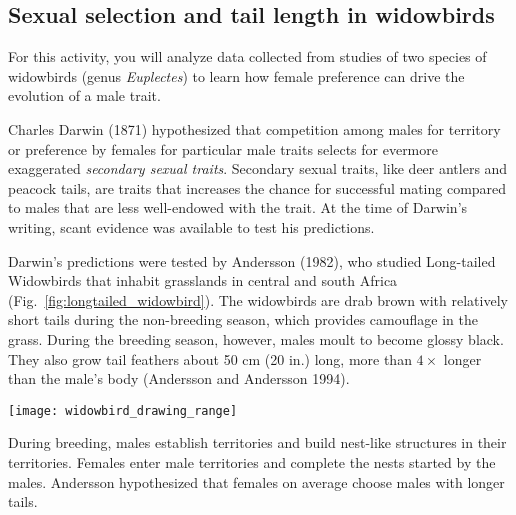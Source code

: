 \documentclass[12pt, hidelinks]{exam}
\begin{document}
\subsection*{Sexual selection and tail length in widowbirds}

For this activity, you will analyze data collected from studies of two species of widowbirds
(genus \textit{Euplectes}) to learn how female preference can drive the evolution
of a male trait. 

Charles Darwin (1871) hypothesized that competition among males for territory or preference by females for particular male traits selects for evermore exaggerated \emph{secondary sexual traits}. Secondary sexual traits, like deer antlers and peacock tails, are traits that increases the chance for successful mating compared to males that are less well-endowed with the trait. At the time of Darwin's writing, scant evidence was available to test his predictions. 

Darwin's predictions were tested by Andersson (1982), who studied Long-tailed Widowbirds that inhabit grasslands in central and south Africa (Fig.~\ref{fig:longtailed_widowbird}). The widowbirds are drab brown with relatively short tails during the non-breeding season, which provides camouflage in the grass. During the breeding season, however, males moult to become glossy black. They also grow tail feathers about 50 cm (20 in.) long, more than $4\times$ longer than the male's body (Andersson and Andersson 1994).


\hfil\begin{minipage}{\textwidth}
	\texttt{[image: widowbird\_drawing\_range]}
\end{minipage}\hfill

During breeding, males establish territories and build nest-like structures in their territories. Females enter male territories and complete the nests started by the males. Andersson hypothesized that females on average choose males with longer tails.

\newpage
\end{document}
